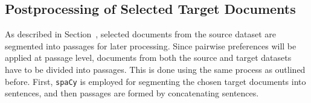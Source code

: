 \subsection{Postprocessing of Selected Target Documents}\label{postprocessing-of-selected-target-documents}
As described in Section~, selected documents from the source dataset are segmented into passages for later processing. Since pairwise preferences will be applied at passage level, documents from both the source and target datasets have to be divided into passages. This is done using the same process as outlined before. First, \texttt{spaCy} is employed for segmenting the chosen target documents into sentences, and then passages are formed by concatenating sentences.

